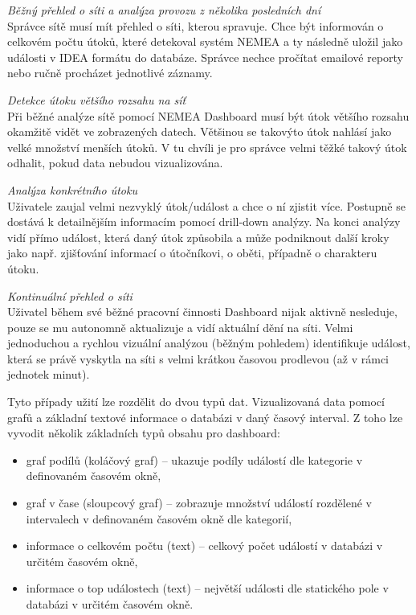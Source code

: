 \begin{description}
    \item \textit{Běžný přehled o síti a analýza provozu z několika posledních dní} \\
        Správce sítě musí mít přehled o síti, kterou spravuje. Chce být informován o celkovém počtu útoků, které detekoval systém NEMEA a ty následně uložil jako události v IDEA formátu do databáze. Správce nechce pročítat emailové reporty nebo ručně procházet jednotlivé záznamy.
    \item \textit{Detekce útoku většího rozsahu na síť} \\
        Při běžné analýze sítě pomocí NEMEA Dashboard musí být útok většího rozsahu okamžitě vidět ve zobrazených datech. Většinou se takovýto útok nahlásí jako velké množství menších útoků. V tu chvíli je pro správce velmi těžké takový útok odhalit, pokud data nebudou vizualizována.
    \item \textit{Analýza konkrétního útoku} \\
        Uživatele zaujal velmi nezvyklý útok/událost a chce o ní zjistit více. Postupně se dostává k detailnějším informacím pomocí drill-down analýzy. Na konci analýzy vidí přímo událost, která daný útok způsobila a může podniknout další kroky jako např. zjišťování informací o útočníkovi, o oběti, případně o charakteru útoku.
    \item \textit{Kontinuální přehled o síti} \\
        Uživatel během své běžné pracovní činnosti Dashboard nijak aktivně nesleduje, pouze se mu autonomně aktualizuje a vidí aktuální dění na síti. Velmi jednoduchou a rychlou vizuální analýzou (běžným pohledem) identifikuje událost, která se právě vyskytla na síti s velmi krátkou časovou prodlevou (až v rámci jednotek minut).
        
\end{description}

Tyto případy užití lze rozdělit do dvou typů dat. Vizualizovaná data pomocí grafů a základní textové informace o databázi v daný časový interval. Z toho lze vyvodit několik základních typů obsahu pro dashboard:

\begin{itemize}
    \item graf podílů (koláčový graf) -- ukazuje podíly událostí dle kategorie v definovaném časovém okně,
    \item graf v čase (sloupcový graf) -- zobrazuje množství událostí rozdělené v intervalech v definovaném časovém okně dle kategorií,
    \item informace o celkovém počtu (text) -- celkový počet událostí v databázi v určitém časovém okně,
    \item informace o top událostech (text) -- největší události dle statického pole v databázi v určitém časovém okně.
\end{itemize}

